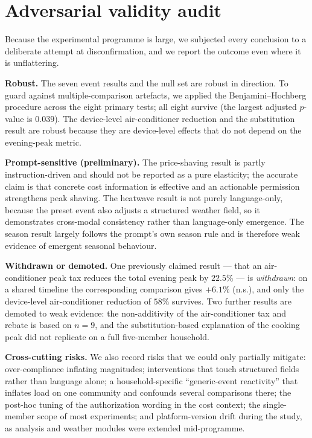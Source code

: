 \documentclass[11pt]{article}
\begin{document}
\section{Adversarial validity audit}
\label{sec:audit}
Because the experimental programme is large, we subjected every conclusion to a deliberate attempt at
disconfirmation, and we report the outcome even where it is unflattering.

\noindent\textbf{Robust.} The seven event results and the null set are robust in direction. To guard
against multiple-comparison artefacts, we applied the Benjamini--Hochberg procedure across the eight
primary tests; all eight survive (the largest adjusted $p$-value is $0.039$). The device-level
air-conditioner reduction and the substitution result are robust because they are device-level effects
that do not depend on the evening-peak metric.

\noindent\textbf{Prompt-sensitive (preliminary).} The price-shaving result is partly instruction-driven
and should not be reported as a pure elasticity; the accurate claim is that concrete cost information is
effective and an actionable permission strengthens peak shaving. The heatwave result is not purely
language-only, because the preset event also adjusts a structured weather field, so it demonstrates
cross-modal consistency rather than language-only emergence. The season result largely follows the
prompt's own season rule and is therefore weak evidence of emergent seasonal behaviour.

\noindent\textbf{Withdrawn or demoted.} One previously claimed result --- that an air-conditioner peak tax
reduces the total evening peak by $22.5\%$ --- is \emph{withdrawn}: on a shared timeline the corresponding
comparison gives $+6.1\%$ (n.s.), and only the device-level air-conditioner reduction of $58\%$ survives.
Two further results are demoted to weak evidence: the non-additivity of the air-conditioner tax and rebate
is based on $n=9$, and the substitution-based explanation of the cooking peak did not replicate on a
full five-member household.

\noindent\textbf{Cross-cutting risks.} We also record risks that we could only partially mitigate:
over-compliance inflating magnitudes; interventions that touch structured fields rather than language
alone; a household-specific ``generic-event reactivity'' that inflates load on one community and confounds
several comparisons there; the post-hoc tuning of the authorization wording in the cost context; the
single-member scope of most experiments; and platform-version drift during the study, as analysis and
weather modules were extended mid-programme.
\end{document}
